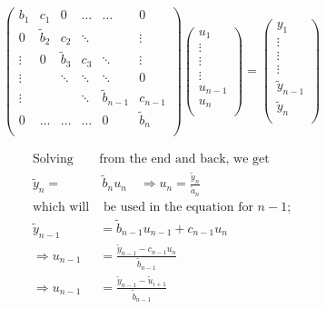 \documentclass[11pt,a4paper,notitlepage]{article}
\begin{document}
\begin{minipage}{0.5\linewidth}
\begin{align*}
\left(\begin{matrix}
  b_1   & c_1    & 0      & \dots   & \dots  & 0         \\
  0   & \tilde{b}_2    & c_2    & \ddots  &        & \vdots   \\
 \vdots     & 0    & \tilde{b}_3    & c_3     & \ddots & \vdots  \\
 \vdots &        & \ddots & \ddots  & \ddots & 0       \\
 \vdots &        &        & \ddots  & \tilde{b}_{n-1} & c_{n-1}     \\
  0     & \dots  & \dots  & \dots   & 0  & \tilde{b}_n     \\
\end{matrix}\right)\left(\begin{matrix}
u_1 \\
\vdots\\
\vdots\\
\vdots\\
u_{n-1}\\
u_{n} \\
\end{matrix}\right) = \left(\begin{matrix}
y_1 \\
\vdots\\
\vdots\\
\vdots\\
\tilde{y}_{n-1}\\
\tilde{y}_{n} \\
\end{matrix}\right)
\end{align*}
\end{minipage}
\begin{minipage}{0.5\linewidth}
\begin{align*}
\text{Solving }&\text{from the end and back, we get}\\
\tilde{y}_n =&\ \tilde{b}_nu_n \quad \Rightarrow u_n = \frac{\tilde{y}_n}{\tilde{a}_n}\\
\text{which will}& \text{ be used in the equation for $n-1$;}\\
\tilde{y}_{n-1} &= \tilde{b}_{n-1}u_{n-1} + c_{n-1}u_n\\
\Rightarrow u_{n-1} &= \frac{\tilde{y}_{n-1} - c_{n-1} u_n}{ \tilde{b}_{n-1}}\\
\Rightarrow u_{n-1} &= \frac{\tilde{y}_{n-1} - \tilde{u}_{i+1}}{ \tilde{b}_{n-1}}
\end{align*}
\end{minipage}
\end{document}
